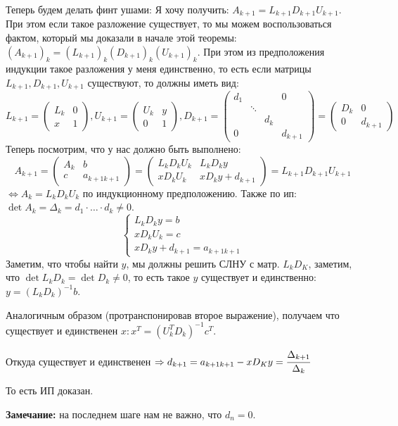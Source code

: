 \begin{enumerate}
        Теперь будем делать финт ушами: Я хочу получить: $A_{k+1} = L_{k+1}D_{k+1}U_{k+1}$. При этом если такое разложение существует, то мы можем воспользоваться фактом, который мы доказали в начале этой теоремы: $(A_{k+1})_k = (L_{k+1})_k(D_{k+1})_k (U_{k+1})_k$. При этом из предположения индукции такое разложения у меня единственно, то есть если матрицы $L_{k+1}, D_{k+1}, U_{k+1}$ существуют, то должны иметь вид:
        $$L_{k+1} = \begin{pmatrix}
            L_k & 0\\
            x & 1 
        \end{pmatrix}, U_{k+1} = \begin{pmatrix}
            U_k & y\\
            0 & 1 
        \end{pmatrix}, D_{k+1} = \begin{pmatrix}
            d_1 &  &  & 0\\
             &  \ddots &  &\\
             &  & d_{k} &\\
             0 & & & d_{k+1}
         \end{pmatrix} = \begin{pmatrix}
             D_k & 0\\
             0 & d_{k+1}
         \end{pmatrix}$$
         Теперь посмотрим, что у нас должно быть выполнено:
         $$A_{k+1} = \begin{pmatrix}
             A_k & b \\
             c & a_{k+1 k+1}
         \end{pmatrix} = \begin{pmatrix}
             L_kD_kU_k & L_kD_ky\\
             x D_k U_k & x D_ky + d_{k+1}
         \end{pmatrix} = L_{k+1}D_{k+1}U_{k+1}$$
         $\Leftrightarrow A_k = L_k D_k U_k$ по индукционному предположению. Также по ип: $\det A_k = \Delta_k = d_1\cdot \ldots \cdot d_k \neq 0$.
        $$\begin{cases}
            L_kD_k y =b\\
            x D_k U_k = c\\
            x D_k y + d_{k+1} = a_{k+1 k+1}
        \end{cases}$$
        Заметим, что чтобы найти $y$, мы должны решить СЛНУ с матр. $L_k D_K$, заметим, что $\det L_k D_k = \det D_k\neq 0$, то есть такое $y$ существует и единственно: $y = (L_k D_k)^{-1}b$.

        Аналогичным образом (протранспонировав второе выражение), получаем что существует и единственен $x: x^T = (U_k^T D_k)^{-1}c^T$.

        Откуда существует и единственен $\Rightarrow d_{k+1} = a_{k+1 k+1} -xD_Ky = \cfrac{\Delta_{k+1}}{\Delta_k}$

         То есть ИП доказан.
         
         \textbf{Замечание:} на последнем шаге нам не важно, что $d_n=0$.
    
    \end{enumerate}
    
